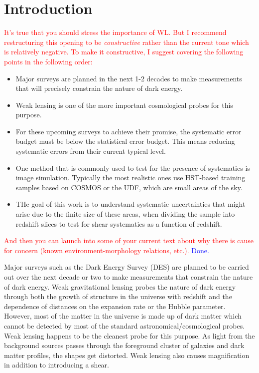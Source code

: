 \documentclass[twocolumn,useAMS,usenatbib]{mn2e}
\newcommand{\rachel}[1]{{\textcolor{red}{#1}}}
\newcommand{\arun}[1]{{\textcolor{blue}{#1}}}
\begin{document}
\section{Introduction}
\label{S:intro}

\rachel{It's true that you should stress the importance of WL.  But
  I recommend restructuring this opening to be {\em constructive}
  rather than the current tone which is relatively negative.  To make
  it constructive, I suggest covering the following points in the
  following order:}
\begin{itemize}
\item Major surveys are planned in the next 1-2 decades
  to make measurements that will precisely constrain the nature of
  dark energy.
\item Weak lensing is one of the more important cosmological probes
  for this purpose.
\item For these upcoming surveys to achieve their promise, the
  systematic error budget must be below the statistical error budget.
  This means reducing systematic errors from their current typical
  level.
\item One method that is commonly used to test for the presence of
  systematics is image simulation.  Typically the most realistic ones
  use HST-based training samples based on COSMOS or the UDF, which are
  small areas of the sky.
\item THe goal of this work is to understand systematic uncertainties
  that might arise due to the finite size of these areas, when
  dividing the sample into redshift slices to test for shear
  systematics as a function of redshift.
\end{itemize}

\rachel{And then you can launch into some of your current text about why there
is cause for concern (known environment-morphology relations, etc.).}
\arun{Done.}

Major surveys such as the Dark Energy Survey (DES) are planned to be carried out over the next decade or two to make measurements that constrain the nature of dark energy.
Weak gravitational lensing probes the nature of dark energy through both the growth of structure in the universe with redshift and the dependence of distances on the expansion rate or the Hubble parameter.
However, most of the matter in the universe is made up of dark matter which cannot be detected by most of the standard astronomical/cosmological probes. Weak lensing happens to be the cleanest probe for this purpose.
As light from the background sources passes through the foreground cluster of galaxies and dark matter profiles, the shapes get distorted. Weak lensing also causes magnification in addition to introducing a shear.
\end{document}

